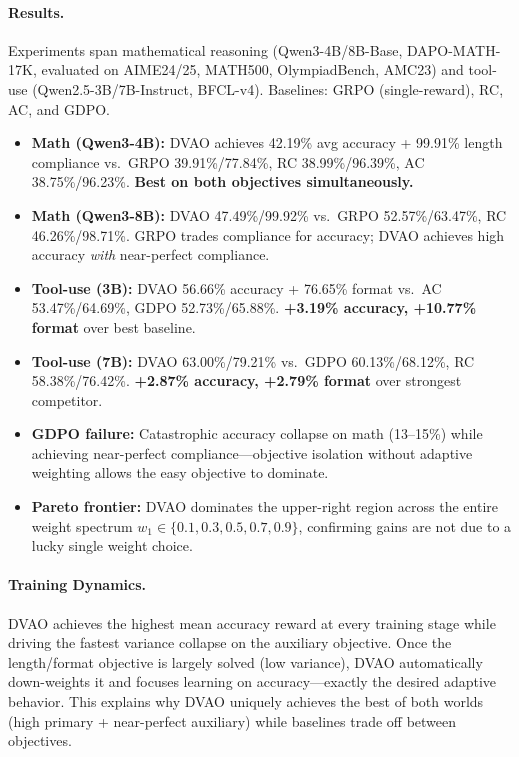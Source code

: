 \documentclass[11pt,a4paper]{article}
\begin{document}
\paragraph{Results.}
Experiments span mathematical reasoning (Qwen3-4B/8B-Base, DAPO-MATH-17K, evaluated on AIME24/25, MATH500, OlympiadBench, AMC23) and tool-use (Qwen2.5-3B/7B-Instruct, BFCL-v4). Baselines: GRPO (single-reward), RC, AC, and GDPO.

\begin{itemize}[nosep]
    \item \textbf{Math (Qwen3-4B):} DVAO achieves 42.19\% avg accuracy + 99.91\% length compliance vs.\ GRPO 39.91\%/77.84\%, RC 38.99\%/96.39\%, AC 38.75\%/96.23\%. \textbf{Best on both objectives simultaneously.}
    \item \textbf{Math (Qwen3-8B):} DVAO 47.49\%/99.92\% vs.\ GRPO 52.57\%/63.47\%, RC 46.26\%/98.71\%. GRPO trades compliance for accuracy; DVAO achieves high accuracy \emph{with} near-perfect compliance.
    \item \textbf{Tool-use (3B):} DVAO 56.66\% accuracy + 76.65\% format vs.\ AC 53.47\%/64.69\%, GDPO 52.73\%/65.88\%. \textbf{+3.19\% accuracy, +10.77\% format} over best baseline.
    \item \textbf{Tool-use (7B):} DVAO 63.00\%/79.21\% vs.\ GDPO 60.13\%/68.12\%, RC 58.38\%/76.42\%. \textbf{+2.87\% accuracy, +2.79\% format} over strongest competitor.
    \item \textbf{GDPO failure:} Catastrophic accuracy collapse on math (13--15\%) while achieving near-perfect compliance---objective isolation without adaptive weighting allows the easy objective to dominate.
    \item \textbf{Pareto frontier:} DVAO dominates the upper-right region across the entire weight spectrum $w_1 \in \{0.1, 0.3, 0.5, 0.7, 0.9\}$, confirming gains are not due to a lucky single weight choice.
\end{itemize}

\paragraph{Training Dynamics.}
DVAO achieves the highest mean accuracy reward at every training stage while driving the fastest variance collapse on the auxiliary objective. Once the length/format objective is largely solved (low variance), DVAO automatically down-weights it and focuses learning on accuracy---exactly the desired adaptive behavior. This explains why DVAO uniquely achieves the best of both worlds (high primary + near-perfect auxiliary) while baselines trade off between objectives.
\end{document}
